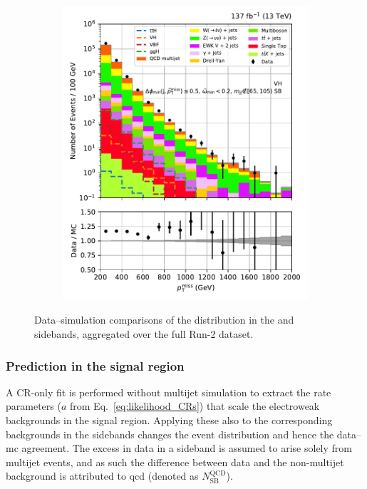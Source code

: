 \begin{figure}[htbp]
\begin{subfigure}[b]{0.45\textwidth}
        \includegraphics[width=\textwidth]{figures/region_plots/full_Run2/VH_sideband/VH.pdf}
        \caption{\VH}
    \end{subfigure}
    \caption[Data--simulation comparisons of the \ptmiss distribution in the \ttH and \VH sidebands, aggregated over the full Run-2 dataset]{Data--simulation comparisons of the \ptmiss distribution in the \ttH and \VH sidebands, aggregated over the full Run-2 dataset.}
    \label{fig:htoinv_sb_yields_combRun2}
\end{figure}




\subsubsection{Prediction in the signal region}
\label{subsubsec:htoinv_qcd_pred_SR}

A \gls{CR}-only fit is performed without multijet simulation to extract the rate parameters ($a$ from Eq.~\ref{eq:likelihood_CRs}) that scale the electroweak backgrounds in the signal region. Applying these also to the corresponding backgrounds in the sidebands changes the event distribution and hence the data--\acrshort{mc} agreement. The excess in data in a sideband is assumed to arise solely from multijet events, and as such the difference between data and the non-multijet background is attributed to \acrshort{qcd} (denoted as $N_{\mathrm{SB}}^{\mathrm{QCD}}$).

